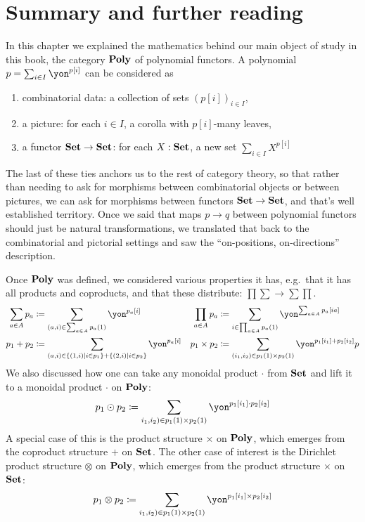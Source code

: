 \documentclass[Book-Poly]{subfiles}
\begin{document}
\section{Summary and further reading}

In this chapter we explained the mathematics behind our main object of study in this book, the category $\mathbf{Poly}$ of polynomial functors. A polynomial $p=\sum_{i\in I}\yon^{p[i]}$ can be considered as 
\begin{enumerate}
	\item combinatorial data: a collection of sets $(p[i])_{i\in I}$,
	\item a picture: for each $i\in I$, a corolla with $p[i]$-many leaves,
	\item a functor $\mathbf{Set}\to\mathbf{Set}$: for each $X:\mathbf{Set}$, a new set $\sum_{i\in I}X^{p[i]}$
\end{enumerate}
The last of these ties anchors us to the rest of category theory, so that rather than needing to ask for morphisms between combinatorial objects or between pictures, we can ask for morphisms between functors $\mathbf{Set}\to\mathbf{Set}$, and that's well established territory. Once we said that maps $p\to q$ between polynomial functors should just be natural transformations, we translated that back to the combinatorial and pictorial settings and saw the ``on-positions, on-directions'' description.

Once $\mathbf{Poly}$ was defined, we considered various properties it has, e.g.\ that it has all products and coproducts, and that these distribute: $\prod\sum\to\sum\prod$.\begin{align*}
	\sum_{a\in A}p_a&\coloneqq\sum_{(a,i)\in\sum_{a\in A}p_a(1)}\yon^{p_a[i]}&
	\prod_{a\in A}p_a&\coloneqq\sum_{i\in\prod_{a\in A}p_a(1)}\yon^{\sum_{a\in A}p_a[i a]}
\\
	p_1+p_2&\coloneqq\sum_{(a,i)\in\{(1,i)\mid i\in p_1\}+\{(2,i)\mid i\in p_2\}}\yon^{p_a[i]}&
	p_1\times p_2&\coloneqq\sum_{(i_1,i_2)\in p_1(1)\times p_2(1)}\yon^{p_1[i_1]+p_2[i_2]}
	p
\end{align*}
 We also discussed how one can take any monoidal product $\cdot$ from $\mathbf{Set}$ and lift it to a monoidal product $\cdot$ on $\mathbf{Poly}$:
\[
	p_1\odot p_2\coloneqq\sum_{i_1,i_2)\in p_1(1)\times p_2(1)}\yon^{p_1[i_1]\cdot p_2[i_2]}
\]
A special case of this is the product structure $\times$ on $\mathbf{Poly}$, which emerges from the coproduct structure $+$ on $\mathbf{Set}$. The other case of interest is the Dirichlet product structure $\otimes$ on $\mathbf{Poly}$, which emerges from the product structure $\times$ on $\mathbf{Set}$:
\[
	p_1\otimes p_2\coloneqq\sum_{i_1,i_2)\in p_1(1)\times p_2(1)}\yon^{p_1[i_1]\times p_2[i_2]}
\]
\end{document}
